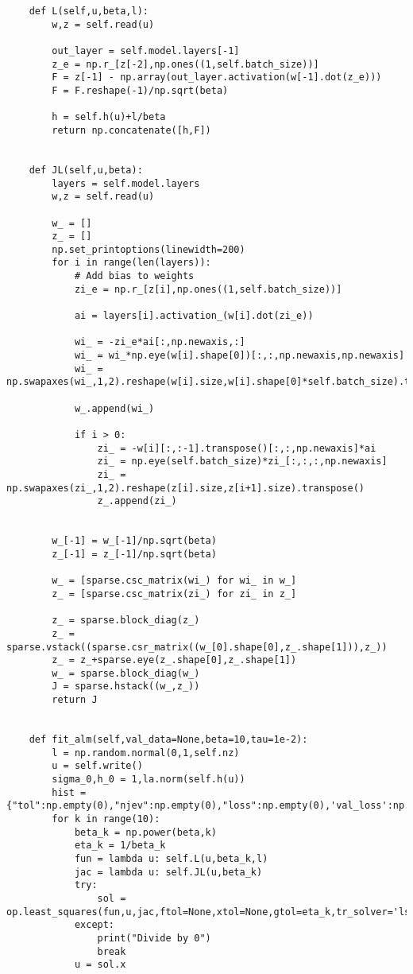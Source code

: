 \begin{verbatim}
    def L(self,u,beta,l):
        w,z = self.read(u)
        
        out_layer = self.model.layers[-1]
        z_e = np.r_[z[-2],np.ones((1,self.batch_size))]
        F = z[-1] - np.array(out_layer.activation(w[-1].dot(z_e)))
        F = F.reshape(-1)/np.sqrt(beta)

        h = self.h(u)+l/beta
        return np.concatenate([h,F])

        
    def JL(self,u,beta):
        layers = self.model.layers
        w,z = self.read(u)

        w_ = []
        z_ = []
        np.set_printoptions(linewidth=200)
        for i in range(len(layers)):
            # Add bias to weights
            zi_e = np.r_[z[i],np.ones((1,self.batch_size))]

            ai = layers[i].activation_(w[i].dot(zi_e))

            wi_ = -zi_e*ai[:,np.newaxis,:]
            wi_ = wi_*np.eye(w[i].shape[0])[:,:,np.newaxis,np.newaxis]
            wi_ = np.swapaxes(wi_,1,2).reshape(w[i].size,w[i].shape[0]*self.batch_size).transpose()

            w_.append(wi_)

            if i > 0:
                zi_ = -w[i][:,:-1].transpose()[:,:,np.newaxis]*ai
                zi_ = np.eye(self.batch_size)*zi_[:,:,:,np.newaxis]
                zi_ = np.swapaxes(zi_,1,2).reshape(z[i].size,z[i+1].size).transpose()
                z_.append(zi_)

        
        w_[-1] = w_[-1]/np.sqrt(beta)
        z_[-1] = z_[-1]/np.sqrt(beta)

        w_ = [sparse.csc_matrix(wi_) for wi_ in w_]
        z_ = [sparse.csc_matrix(zi_) for zi_ in z_]
        
        z_ = sparse.block_diag(z_)
        z_ = sparse.vstack((sparse.csr_matrix((w_[0].shape[0],z_.shape[1])),z_))
        z_ = z_+sparse.eye(z_.shape[0],z_.shape[1])
        w_ = sparse.block_diag(w_)
        J = sparse.hstack((w_,z_))
        return J
            

    def fit_alm(self,val_data=None,beta=10,tau=1e-2):
        l = np.random.normal(0,1,self.nz)
        u = self.write()
        sigma_0,h_0 = 1,la.norm(self.h(u))
        hist = {"tol":np.empty(0),"njev":np.empty(0),"loss":np.empty(0),'val_loss':np.empty(0)}
        for k in range(10):
            beta_k = np.power(beta,k)
            eta_k = 1/beta_k
            fun = lambda u: self.L(u,beta_k,l)
            jac = lambda u: self.JL(u,beta_k)
            try:
                sol = op.least_squares(fun,u,jac,ftol=None,xtol=None,gtol=eta_k,tr_solver='lsmr')
            except:
                print("Divide by 0")
                break
            u = sol.x


\end{verbatim}

